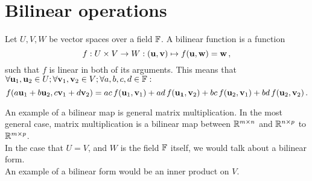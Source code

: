 \section{Bilinear operations}
    Let $U, V, W$ be vector spaces over a field $\mathbb{F}$. A bilinear function is a function
    \begin{equation}
        f: U \times V \rightarrow W: (\vb{u}, \vb{v}) \mapsto f(\vb{u}, \vb{w}) = \vb{w} \thinspace ,
    \end{equation}
    such that $f$ is linear in both of its arguments. This means that $\forall \vb{u}_1, \vb{u}_2 \in U; \forall \vb{v}_1, \vb{v}_2 \in V; \forall a, b, c, d \in \mathbb{F}:$
    \begin{equation}
        f(a \vb{u}_1 + b \vb{u}_2, c \vb{v}_1 + d \vb{v}_2) = ac \thinspace f(\vb{u}_1, \vb{v}_1) + ad \thinspace f(\vb{u_1}, \vb{v}_2) + bc \thinspace f(\vb{u}_2, \vb{v}_1) + bd \thinspace f(\vb{u}_2, \vb{v}_2) \thinspace .
    \end{equation}

    An example of a bilinear map is general matrix multiplication. In the most general case, matrix multiplication is a bilinear map between $\mathbb{R}^{m \times n}$ and $\mathbb{R}^{n \times p}$ to $\mathbb{R}^{m \times p}$. \\

    In the case that $U=V$, and $W$ is the field $\mathbb{F}$ itself, we would talk about a bilinear form. \\

    An example of a bilinear form would be an inner product on $V$. \\
